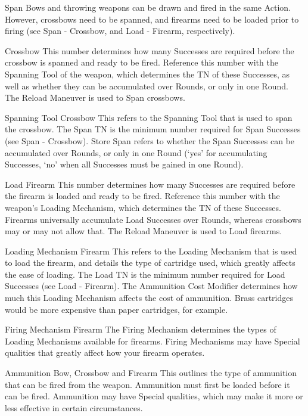 \documentclass[oneside,11pt,english]{book}
\begin{document}
 

Span 
Bows and throwing weapons can be drawn and fired in the same Action. However, crossbows need to be 
spanned, and firearms need to be loaded prior to firing (see Span - Crossbow, and Load - Firearm, 
respectively). 

 

Crossbow 
This number determines how many Successes are required before the crossbow is spanned and ready to 
be fired. Reference this number with the Spanning Tool of the weapon, which determines the TN of these 
Successes, as well as whether they can be accumulated over Rounds, or only in one Round. The Reload 
Maneuver is used to Span crossbows. 

 

Spanning Tool 
Crossbow 
This refers to the Spanning Tool that is used to span the crossbow. The Span TN is the minimum number 
required for Span Successes (see Span - Crossbow). Store Span refers to whether the Span Successes can 
be accumulated over Rounds, or only in one Round (‘yes’ for accumulating Successes, ‘no’ when all 
Successes must be gained in one Round). 


 

Load 
Firearm 
This number determines how many Successes are required before the firearm is loaded and ready to be 
fired. Reference this number with the weapon’s Loading Mechanism, which determines the TN of these 
Successes. Firearms universally accumulate Load Successes over Rounds, whereas crossbows may or 
may not allow that. The Reload Maneuver is used to Load firearms. 

 

Loading Mechanism 
Firearm 
This refers to the Loading Mechanism that is used to load the firearm, and details the type of cartridge 
used, which greatly affects the ease of loading. The Load TN is the minimum number required for Load 
Successes (see Load - Firearm). The Ammunition Cost Modifier determines how much this Loading 
Mechanism affects the cost of ammunition. Brass cartridges would be more expensive than paper 
cartridges, for example. 
 


Firing Mechanism 
Firearm 
The Firing Mechanism determines the types of Loading Mechanisms available for firearms. Firing 
Mechanisms may have Special qualities that greatly affect how your firearm operates. 
 
Ammunition 
Bow, Crossbow and Firearm 
This outlines the type of ammunition that can be fired from the weapon. Ammunition must first be loaded 
before it can be fired. Ammunition may have Special qualities, which may make it more or less effective 
in certain circumstances. 
\end{document}
